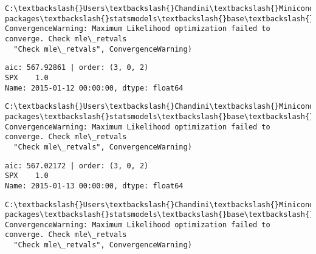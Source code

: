 \documentclass[11pt]{article}
\begin{document}
    \begin{Verbatim}[commandchars=\\\{\}]
C:\textbackslash{}Users\textbackslash{}Chandini\textbackslash{}Miniconda3\textbackslash{}envs\textbackslash{}auquan\textbackslash{}lib\textbackslash{}site-packages\textbackslash{}statsmodels\textbackslash{}base\textbackslash{}model.py:496: ConvergenceWarning: Maximum Likelihood optimization failed to converge. Check mle\_retvals
  "Check mle\_retvals", ConvergenceWarning)

    \end{Verbatim}

    \begin{Verbatim}[commandchars=\\\{\}]
aic: 567.92861 | order: (3, 0, 2)
SPX    1.0
Name: 2015-01-12 00:00:00, dtype: float64

    \end{Verbatim}

    \begin{Verbatim}[commandchars=\\\{\}]
C:\textbackslash{}Users\textbackslash{}Chandini\textbackslash{}Miniconda3\textbackslash{}envs\textbackslash{}auquan\textbackslash{}lib\textbackslash{}site-packages\textbackslash{}statsmodels\textbackslash{}base\textbackslash{}model.py:496: ConvergenceWarning: Maximum Likelihood optimization failed to converge. Check mle\_retvals
  "Check mle\_retvals", ConvergenceWarning)

    \end{Verbatim}

    \begin{Verbatim}[commandchars=\\\{\}]
aic: 567.02172 | order: (3, 0, 2)
SPX    1.0
Name: 2015-01-13 00:00:00, dtype: float64

    \end{Verbatim}

    \begin{Verbatim}[commandchars=\\\{\}]
C:\textbackslash{}Users\textbackslash{}Chandini\textbackslash{}Miniconda3\textbackslash{}envs\textbackslash{}auquan\textbackslash{}lib\textbackslash{}site-packages\textbackslash{}statsmodels\textbackslash{}base\textbackslash{}model.py:496: ConvergenceWarning: Maximum Likelihood optimization failed to converge. Check mle\_retvals
  "Check mle\_retvals", ConvergenceWarning)

    \end{Verbatim}
\end{document}
